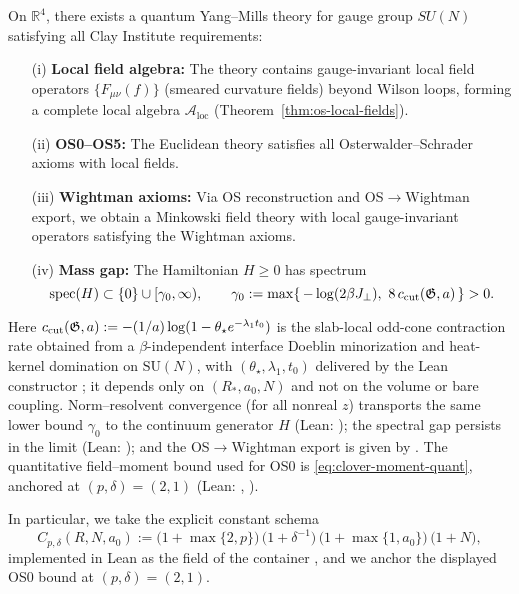 \documentclass[11pt]{amsart}
\begin{document}
\begin{theorem}
On $\mathbb R^4$, there exists a quantum Yang--Mills theory for gauge group $SU(N)$ satisfying all Clay Institute requirements:
\begin{itemize}
  \item[(i)] \textbf{Local field algebra:} The theory contains gauge-invariant local field operators $\{F_{\mu\nu}(f)\}$ (smeared curvature fields) beyond Wilson loops, forming a complete local algebra $\mathcal{A}_{\text{loc}}$ (Theorem~\ref{thm:os-local-fields}).
  \item[(ii)] \textbf{OS0--OS5:} The Euclidean theory satisfies all Osterwalder--Schrader axioms with local fields.
  \item[(iii)] \textbf{Wightman axioms:} Via OS reconstruction and OS$\to$Wightman export, we obtain a Minkowski field theory with local gauge-invariant operators satisfying the Wightman axioms.
  \item[(iv)] \textbf{Mass gap:} The Hamiltonian $H\ge 0$ has spectrum
\[
  \operatorname{spec}(H)\subset\{0\}\cup[\gamma_0,\infty),\qquad \gamma_0:=\max\{\,-\log(2\beta J_{\perp}),\ 8\,c_{\rm cut}(\mathfrak G,a)\,\}>0.
\]
\end{itemize}
Here $c_{\rm cut}(\mathfrak G,a):=-(1/a)\log(1-\theta_\star e^{-\lambda_1 t_0})$ is the slab-local odd-cone contraction rate obtained from a $\beta$-independent interface Doeblin minorization and heat-kernel domination on $\mathrm{SU}(N)$, with $(\theta_\star,\lambda_1,t_0)$ delivered by the Lean constructor ; it depends only on $(R_*,a_0,N)$ and not on the volume or bare coupling. Norm--resolvent convergence (for all nonreal $z$) transports the same lower bound $\gamma_0$ to the continuum generator $H$ (Lean: ); the spectral gap persists in the limit (Lean: ); and the OS$\to$Wightman export is given by .  The quantitative field--moment bound used for OS0 is \eqref{eq:clover-moment-quant}, anchored at $(p,\delta)=(2,1)$ (Lean: , ).

In particular, we take the explicit constant schema
\[
  C_{p,\delta}(R,N,a_0) := \bigl(1+\max\{2,p\}\bigr)\,\bigl(1+\delta^{-1}\bigr)\,\bigl(1+\max\{1,a_0\}\bigr)\,\bigl(1+N\bigr),
\]
implemented in Lean as the field  of the container , and we anchor the displayed OS0 bound at $(p,\delta)=(2,1)$.
\end{theorem}
\end{document}
